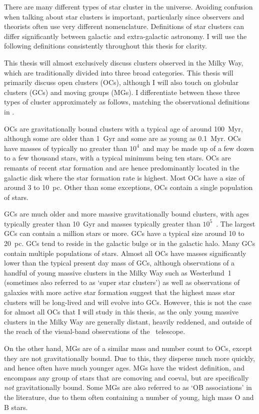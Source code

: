 There are many different types of star cluster in the universe. Avoiding confusion when talking about star clusters is important, particularly since observers and theorists often use very different nomenclature. Definitions of star clusters can differ significantly between galactic and extra-galactic astronomy. I will use the following definitions consistently throughout this thesis for clarity.

This thesis will almost exclusively discuss clusters observed in the Milky Way, which are traditionally divided into three broad categories. This thesis will primarily discuss open clusters (OCs), although I will also touch on globular clusters (GCs) and moving groups (MGs). I differentiate between these three types of cluster approximately as follows, matching the observational definitions in \cite{portegies_zwart_young_2010}.

OCs are gravitationally bound clusters with a typical age of around 100~Myr, although some are older than 1~Gyr and some are as young as 0.1~Myr. OCs have masses of typically no greater than $10^4$~\MSun and may be made up of a few dozen to a few thousand stars, with a typical minimum being ten stars. OCs are remants of recent star formation and are hence predominantly located in the galactic disk where the star formation rate is highest. Most OCs have a size of around 3 to 10~pc. Other than some exceptions, OCs contain a single population of stars. 

GCs are much older and more massive gravitationally bound clusters, with ages typically greater than 10~Gyr and masses typically greater than $10^5$~\MSun. The largest GCs can contain a million stars or more. GCs have a typical size around 10 to 20~pc. GCs tend to reside in the galactic bulge or in the galactic halo. Many GCs contain multiple populations of stars. Almost all OCs have masses significantly lower than the typical present day mass of GCs, although observations of a handful of young massive clusters in the Milky Way such as Westerlund~1 (sometimes also referred to as `super star clusters') as well as observations of galaxies with more active star formation suggest that the highest mass star clusters will be long-lived and will evolve into GCs. However, this is not the case for almost all OCs that I will study in this thesis, as the only young massive clusters in the Milky Way are generally distant, heavily reddened, and outside of the reach of the visual-band observations of the \gaia\ telescope.

On the other hand, MGs are of a similar mass and number count to OCs, except they are not gravitationally bound. Due to this, they disperse much more quickly, and hence often have much younger ages. MGs have the widest definition, and encompass any group of stars that are comoving and coeval, but are specifically \emph{not} gravitationally bound. Some MGs are also referred to as `OB associations' in the literature, due to them often containing a number of young, high mass O and B stars. 

